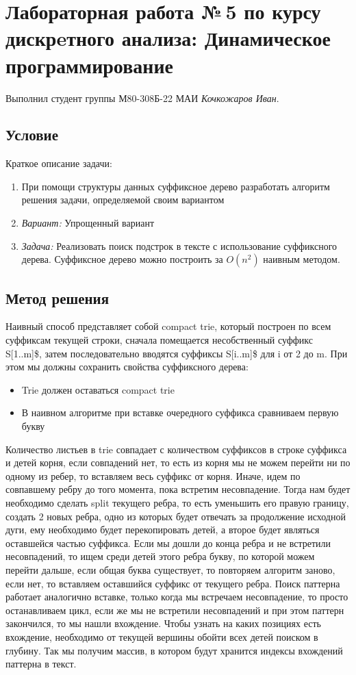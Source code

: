 \documentclass[12pt]{article}
\begin{document}
\section*{Лабораторная работа №\,5 по курсу дискрeтного анализа: Динамическое программирование}

Выполнил студент группы М80-308Б-22 МАИ \textit{Кочкожаров Иван}.

\subsection*{Условие}

Краткое описание задачи:
\begin{enumerate}
    \item При помощи структуры данных суффиксное дерево разработать алгоритм решения задачи, определяемой
    своим вариантом
    \item \textit{Вариант:} Упрощенный вариант
    \item \textit{Задача:} Реализовать поиск подстрок в тексте с использование суффиксного дерева. Суффиксное дерево можно построить за $O(n^2)$ наивным методом. 
\end{enumerate}

\subsection*{Метод решения}

Наивный способ представляет собой compact trie, который построен по всем суффиксам
текущей строки, сначала помещается несобственный суффикс S[1..m]\$, затем
последовательно вводятся суффиксы S[i..m]\$ для i от 2 до m.
При этом мы должны сохранить свойства суффиксного дерева:
\begin{itemize}
    \item Trie должен оставаться compact trie
    \item В наивном алгоритме при вставке очередного суффикса сравниваем первую букву
\end{itemize}
Количество листьев в trie совпадает с количеством суффиксов в строке
суффикса и детей корня, если совпадений нет, то есть из корня мы не можем перейти
ни по одному из ребер, то вставляем весь суффикс от корня. Иначе, идем по совпавшему
ребру до того момента, пока встретим несовпадение. Тогда нам будет необходимо сделать
split текущего ребра, то есть уменьшить его правую границу, создать 2 новых ребра,
одно из которых будет отвечать за продолжение исходной дуги, ему необходимо будет
перекопировать детей, а второе будет являться оставшейся частью суффикса. Если мы
дошли до конца ребра и не встретили несовпадений, то ищем среди детей этого ребра
букву, по которой можем перейти дальше, если общая буква существует, то повторяем
алгоритм заново, если нет, то вставляем оставшийся суффикс от текущего ребра.
Поиск паттерна работает аналогично вставке, только когда мы встречаем несовпадение,
то просто останавливаем цикл, если же мы не встретили несовпадений и при этом
паттерн закончился, то мы нашли вхождение. Чтобы узнать на каких позициях есть
вхождение, необходимо от текущей вершины обойти всех детей поиском в глубину. Так
мы получим массив, в котором будут хранится индексы вхождений паттерна в текст.
\end{document}
